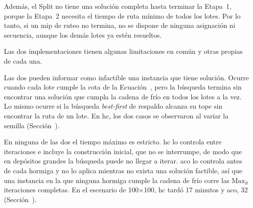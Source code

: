Además, el Split no tiene una solución completa hasta terminar la
Etapa~1, porque la Etapa~2 necesita el tiempo de ruta mínimo de todos los
lotes. Por lo tanto, si un \ac{mip} de ruteo no termina, no se dispone de ninguna
asignación ni secuencia, aunque los demás lotes ya estén resueltos.

\stopsubsubsection

\stopsubsection

\startsubsection[title={De las heurísticas}, reference=sec:heur_limitaciones]

Las dos implementaciones tienen algunas limitaciones en común y otras propias
de cada una.

\startsubsubsection[title={Comunes a las dos heurísticas}]

\startitemize
	\item Las dos pueden informar como infactible una instancia que tiene
	solución. Ocurre cuando cada lote cumple la cota de la
	Ecuación~, pero la búsqueda termina sin encontrar
	una solución que cumpla la cadena de frío en todos los lotes a la vez. Lo mismo ocurre si la búsqueda {\em best-first} de
	respaldo alcanza su tope sin encontrar la ruta de un lote. En \ac{hc},
	los dos casos se observaron al variar la semilla
	(Sección~).
	\item En ninguna de las dos el tiempo máximo es estricto. \ac{hc} lo controla entre
	iteraciones e incluye la construcción inicial, que no se interrumpe, de
	modo que en depósitos grandes la búsqueda puede no llegar a iterar.
	\ac{aco} lo controla antes de cada hormiga y no lo aplica mientras no
	exista una solución factible, así que una instancia en la que ninguna
	hormiga cumple la cadena de frío corre las $\text{Max}_{\text{it}}$
	iteraciones completas. En el escenario de 100×100, \ac{hc} tardó 17
	minutos y \ac{aco}, 32 (Sección~).
\stopitemize

\stopsubsubsection

\startsubsubsection[title={Propias de Hill Climbing}, reference=sec:hc_limitaciones]

